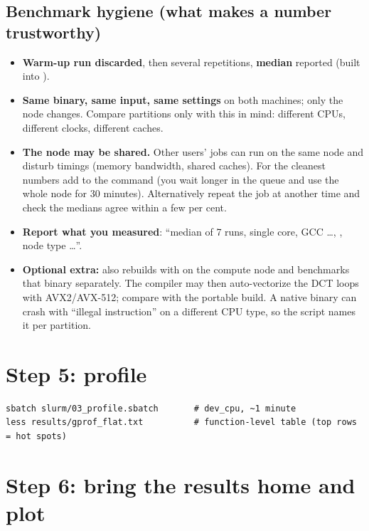 \subsection{Benchmark hygiene (what makes a number trustworthy)}

\begin{itemize}
\item \textbf{Warm-up run discarded}, then several repetitions, \textbf{median} reported (built into ).
\item \textbf{Same binary, same input, same settings} on both machines; only the node changes. Compare partitions only with this in mind: different CPUs, different clocks, different caches.
\item \textbf{The node may be shared.} Other users' jobs can run on the same node and disturb timings (memory bandwidth, shared caches). For the cleanest numbers add  to the  command (you wait longer in the queue and use the whole node for 30 minutes). Alternatively repeat the job at another time and check the medians agree within a few per cent.
\item \textbf{Report what you measured}: ``median of 7 runs, single core, GCC \dots, , node type \dots''.
\item \textbf{Optional extra:}  also rebuilds with  on the compute node and benchmarks that binary separately. The compiler may then auto-vectorize the DCT loops with AVX2/AVX-512; compare with the portable build. A native binary can crash with ``illegal instruction'' on a different CPU type, so the script names it per partition.
\end{itemize}

\section{Step 5: profile}

\begin{lstlisting}[style=shell]
sbatch slurm/03_profile.sbatch       # dev_cpu, ~1 minute
less results/gprof_flat.txt          # function-level table (top rows = hot spots)
\end{lstlisting}

\section{Step 6: bring the results home and plot}

